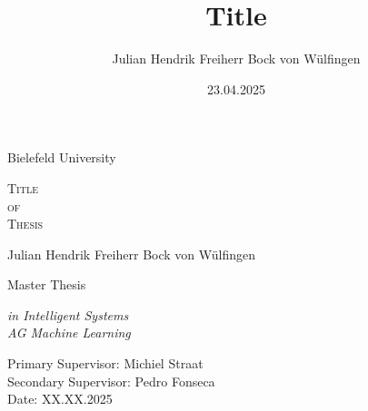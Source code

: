 \documentclass{report} %
\title{
    Title
}
\author{Julian Hendrik Freiherr Bock von Wülfingen}
\date{23.04.2025}
\begin{document}
\onehalfspacing


\begin{titlepage}

	\begin{center}

        \vspace*{\baselineskip}

        {\Large Bielefeld University}
        
        \vspace{1.75\baselineskip}

        {\LARGE \scshape Title \\ of \\ Thesis\par} %

        \vspace{5\baselineskip}
        
        {\Large Julian Hendrik Freiherr Bock von Wülfingen}
        
        \vspace{2\baselineskip}

        {\Large Master Thesis\vspace{1em}}
        
        \textit{in Intelligent Systems \vspace{1em} \\ AG Machine Learning}
	
        \vfill

        \vspace{0.3\baselineskip}
        
        Primary Supervisor:     Michiel Straat\\
        Secondary Supervisor:   Pedro Fonseca\\
        Date:		            XX.XX.2025

    \end{center}

\end{titlepage}

\tableofcontents

\cleardoublepage
{}

















% 
\end{document}
